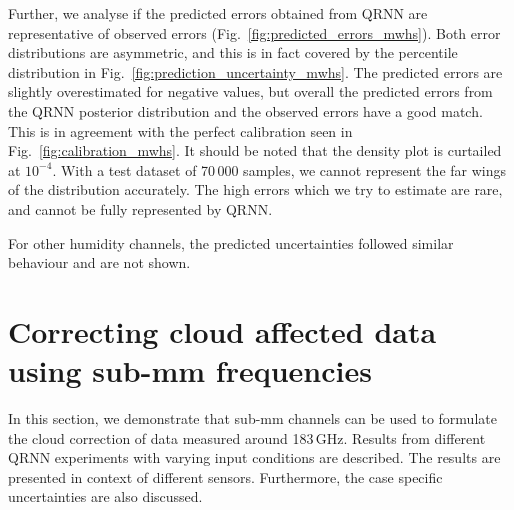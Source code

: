 \documentclass[amt, manuscript]{copernicus}
\begin{document}
Further, we analyse if the  predicted errors obtained from QRNN are representative of observed errors (Fig.~\ref{fig:predicted_errors_mwhs}). Both error distributions are asymmetric, and this is in fact covered by the percentile distribution  in Fig.~\ref{fig:prediction_uncertainty_mwhs}. The predicted errors are slightly overestimated for negative values, but overall the predicted errors from the QRNN posterior distribution and the observed errors have a good match. This is in agreement with the perfect calibration seen in Fig.~\ref{fig:calibration_mwhs}. It should be noted that the density plot is curtailed at $10^{-4}$. With a test dataset of 70\,000 samples, we cannot represent the far wings of the distribution accurately. The high errors which we try to estimate are rare, and cannot be fully represented by QRNN. 

For other humidity channels, the predicted uncertainties followed similar behaviour and are not shown. 


\section{Correcting cloud affected data using sub-mm frequencies}
\label{qrnn_ici}
In this section, we demonstrate that sub-mm channels can be used to formulate the cloud correction of data measured around 183\,GHz. Results from different QRNN experiments with varying input conditions are described. The results are presented in context of different sensors. Furthermore, the case specific uncertainties are also discussed.
\end{document}
